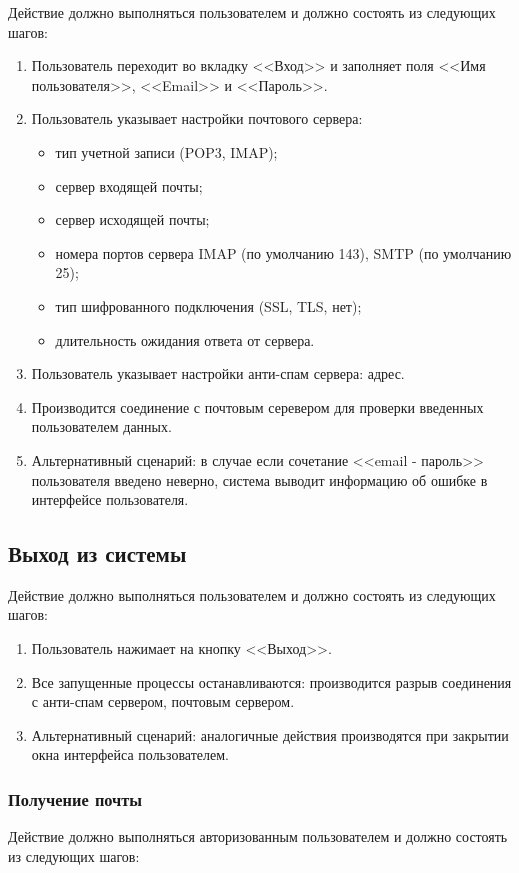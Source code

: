 Действие должно выполняться пользователем и должно состоять из следующих шагов:
\begin{enumerate}
  \item Пользователь переходит во вкладку <<Вход>> и заполняет поля <<Имя пользователя>>, <<Email>> и <<Пароль>>.
  \item Пользователь указывает настройки почтового сервера:
    \begin{itemize}
      \item тип учетной записи (POP3, IMAP);
      \item сервер входящей почты;
      \item сервер исходящей почты;
      \item номера портов сервера IMAP (по умолчанию 143), SMTP (по умолчанию 25);
      \item тип шифрованного подключения (SSL, TLS, нет);
      \item длительность ожидания ответа от сервера.
    \end{itemize}
  \item Пользователь указывает настройки анти-спам сервера: адрес.
  \item Производится соединение с почтовым серевером для проверки введенных пользователем данных.
  \item Альтернативный сценарий: в случае если сочетание <<email - пароль>> пользователя введено неверно, система выводит информацию об ошибке в интерфейсе пользователя.
\end{enumerate}

\subsection{Выход из системы}
Действие должно выполняться пользователем и должно состоять из следующих шагов:
\begin{enumerate}
  \item Пользователь нажимает на кнопку <<Выход>>.
  \item Все запущенные процессы останавливаются: производится разрыв соединения с анти-спам сервером, почтовым сервером.
  \item Альтернативный сценарий: аналогичные действия производятся при закрытии окна интерфейса пользователем.
\end{enumerate}

\subsubsection{Получение почты}
Действие должно выполняться авторизованным пользователем и должно состоять из следующих шагов:

